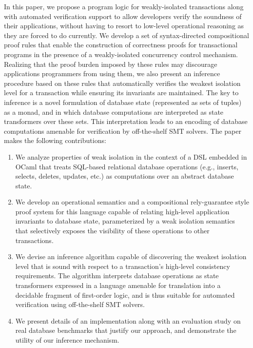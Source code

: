 In this paper, we propose a program logic for weakly-isolated
transactions along with automated verification support to allow
developers verify the soundness of their applications, without
having to resort to low-level operational reasoning as they are forced
to do currently.  We develop a set of syntax-directed compositional
proof rules that enable the construction of correctness proofs for
transactional programs in the presence of a weakly-isolated
concurrency control mechanism.  Realizing that the proof burden
imposed by these rules may discourage applications programmers from
using them, we also present an inference procedure based on these
rules that automatically verifies the weakest isolation level for a
transaction while ensuring its invariants are maintained.  The key to
inference is a novel formulation of database state (represented as
sets of tuples) as a monad, and in which database computations are
interpreted as state transformers over these sets.  This
interpretation leads to an encoding of database computations amenable
for verification by off-the-shelf SMT solvers.  The paper makes the
following contributions:
\begin{enumerate}
  \item We analyze properties of weak isolation in the context of a
    DSL embedded in OCaml that treats SQL-based relational database
    operations (e.g., inserts, selects, deletes, updates, etc.) as
    computations over an abstract database state.
  \item We develop an operational semantics and a compositional
    rely-guarantee style proof system for this language capable of
    relating high-level application invariants to database state,
    parameterized by a weak isolation semantics that selectively
    exposes the visibility of these operations to other transactions.
  \item We devise an inference algorithm capable of discovering the
    weakest isolation level that is sound with respect to a
    transaction's high-level consistency requirements. The algorithm
    interprets database operations as state transformers expressed in
    a language amenable for translation into a decidable fragment of
    first-order logic, and is thus suitable for automated verification
    using off-the-shelf SMT solvers.
  \item We present details of an implementation along with an
    evaluation study on real database benchmarks that justify our
    approach, and demonstrate the utility of our inference mechanism.
\end{enumerate}
